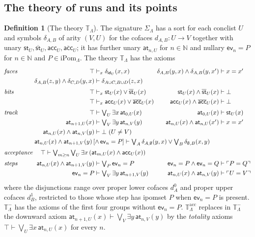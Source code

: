 \documentclass{lmcs}
\theoremstyle{definition}
\newtheorem{definition}[theorem]{Definition}
\theoremstyle{remark}
\newcommand{\Nn}{\mathbb{N}}
\newcommand{\Tt}{\mathbb{T}}
\newcommand{\cid}{\mathsf{id}}
\newcommand{\ip}{\mathsf{ev}}
\newcommand{\Ipom}{\mathrm{iPom}}
\newcommand{\Der}{\vdash}
\newcommand{\TR}{\Tt_{\Lambda}}
\newcommand{\TRm}{\Tt^{-}_{\Lambda}}
\newcommand{\SigR}{\Sigma_{\Lambda}}
\newcommand{\pprop}[1]{\ulcorner #1\urcorner}
\providecommand{\Tacc}{\Tt^{\mathrm{acc}}_{\Lambda}}
\providecommand{\fsym}[1]{\delta_{#1}}
\providecommand{\evat}[2]{\ip_{#1}=#2}
\providecommand{\nst}{\overline{\mathsf{st}}}
\providecommand{\nacc}{\overline{\mathsf{acc}}}
\begin{document}
\subsection{The theory of runs and its points}\label{ssec:theory}

\begin{definition}[The theory $\TR$]\label{def:theory}
The signature $\SigR$ has a sort for each conclist $U$ and symbols $\fsym{A,B}$ of arity $(V,U)$ for the
cofaces $d_{A,B}\colon U\to V$ together with unary $\mathsf{st}_U,\nst_U,\mathsf{acc}_U,\nacc_U$;
it has further unary $\mathsf{at}_{n,U}$ for $n\in\Nn$ and nullary $\evat{n}{P}$ for
$n\in\Nn$ and $P\in\Ipom_\Lambda$. The theory $\TR$ has the axioms
\[
\renewcommand{\arraystretch}{1.3}
\begin{array}{@{}l@{\;}r@{\;}l@{\enspace}r@{\;}l@{}}
\textit{faces} & \top & \Der_x\fsym{\cid_U}(x,x) & \fsym{A,B}(y,x)\wedge\fsym{A,B}(y,x') & \Der x=x'\\
 & \fsym{A,B}(z,y)\wedge\fsym{C,D}(y,x) & \Der\fsym{A\cup C,B\cup D}(z,x)\\[2pt]
\textit{bits} & \top & \Der_x\mathsf{st}_U(x)\vee\nst_U(x) & \mathsf{st}_U(x)\wedge\nst_U(x) & \Der\bot\\
 & \top & \Der_x\mathsf{acc}_U(x)\vee\nacc_U(x) & \mathsf{acc}_U(x)\wedge\nacc_U(x) & \Der\bot\\[2pt]
\textit{track} & \top & \Der\textstyle\bigvee_U\exists x\,\mathsf{at}_{0,U}(x) & \mathsf{at}_{0,U}(x) & \Der\mathsf{st}_U(x)\\
 & \mathsf{at}_{n+1,U}(x) & \Der\textstyle\bigvee_V\exists y\,\mathsf{at}_{n,V}(y) & \mathsf{at}_{n,U}(x)\wedge\mathsf{at}_{n,U}(x') & \Der x=x'\\
 & \mathsf{at}_{n,U}(x)\wedge\mathsf{at}_{n,V}(y) & \Der\bot\ (U\neq V)\\
 & \multicolumn{4}{@{}l@{}}{\mathsf{at}_{n,U}(x)\wedge\mathsf{at}_{n+1,V}(y)\,[\wedge\,\evat{n}{P}]\Der
    \textstyle\bigvee_{A}\fsym{A,\emptyset}(y,x)\vee\bigvee_{B}\fsym{\emptyset,B}(x,y)}\\[2pt]
\textit{acceptance} & \multicolumn{4}{@{\quad}l@{}}{\top\Der\textstyle\bigvee_{m\geq n}\bigvee_U\exists x\,(\mathsf{at}_{m,U}(x)\wedge\mathsf{acc}_U(x))}\\[2pt]
\textit{steps} & \mathsf{at}_{n,U}(x)\wedge\mathsf{at}_{n+1,V}(y) & \Der\textstyle\bigvee_P\evat{n}{P} & \evat{n}{P}\wedge\evat{n}{Q} & \Der\pprop{P=Q}\\
 & \evat{n}{P} & \Der\textstyle\bigvee_V\exists y\,\mathsf{at}_{n+1,V}(y) & \mathsf{at}_{n,U}(x)\wedge\mathsf{at}_{n,V}(y) & \Der\pprop{U=V}
\end{array}
\]
where the disjunctions range over proper lower cofaces $d^0_A$ and proper upper cofaces
$d^1_B$, restricted to those whose step has
ipomset $P$ when $\evat{n}{P}$ is present. $\TRm$ has the axioms of the first
four groups without $\evat{n}{P}$. $\Tacc$ replaces in $\TRm$ the downward axiom
$\mathsf{at}_{n+1,U}(x)\Der\bigvee_V\exists y\,\mathsf{at}_{n,V}(y)$ by the \emph{totality} axioms
$\top\Der\bigvee_U\exists x\,\mathsf{at}_{n,U}(x)$ for every $n$.
\end{definition}
\end{document}
